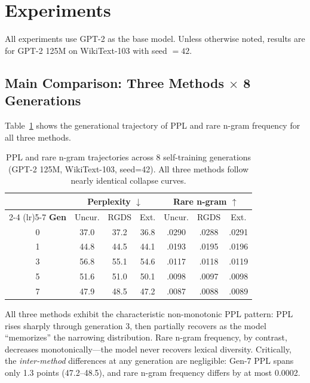 \documentclass[11pt]{article}
\begin{document}
\section{Experiments}

All experiments use GPT-2 \citep{radford2019language} as the base model. Unless otherwise noted, results are for GPT-2 125M on WikiText-103 with seed $= 42$.

\subsection{Main Comparison: Three Methods $\times$ 8 Generations}
\label{sec:main}

Table~\ref{tab:main_trajectory} shows the generational trajectory of PPL and rare n-gram frequency for all three methods.

\begin{table}[h]
\centering
\caption{PPL and rare n-gram trajectories across 8 self-training generations (GPT-2 125M, WikiText-103, seed=42). All three methods follow nearly identical collapse curves.}
\label{tab:main_trajectory}
\small
\begin{tabular}{c ccc ccc}
\toprule
& \multicolumn{3}{c}{\textbf{Perplexity} $\downarrow$} & \multicolumn{3}{c}{\textbf{Rare n-gram} $\uparrow$} \\
\cmidrule(lr){2-4} \cmidrule(lr){5-7}
\textbf{Gen} & Uncur. & RGDS & Ext. & Uncur. & RGDS & Ext. \\
\midrule
0 & 37.0 & 37.2 & 36.8 & .0290 & .0288 & .0291 \\
1 & 44.8 & 44.5 & 44.1 & .0193 & .0195 & .0196 \\
3 & 56.8 & 55.1 & 54.6 & .0117 & .0118 & .0119 \\
5 & 51.6 & 51.0 & 50.1 & .0098 & .0097 & .0098 \\
7 & 47.9 & 48.5 & 47.2 & .0087 & .0088 & .0089 \\
\bottomrule
\end{tabular}
\end{table}

All three methods exhibit the characteristic non-monotonic PPL pattern: PPL rises sharply through generation 3, then partially recovers as the model ``memorizes'' the narrowing distribution. Rare n-gram frequency, by contrast, decreases monotonically---the model never recovers lexical diversity. Critically, the \emph{inter-method} differences at any generation are negligible: Gen-7 PPL spans only 1.3 points (47.2--48.5), and rare n-gram frequency differs by at most 0.0002.
\end{document}
